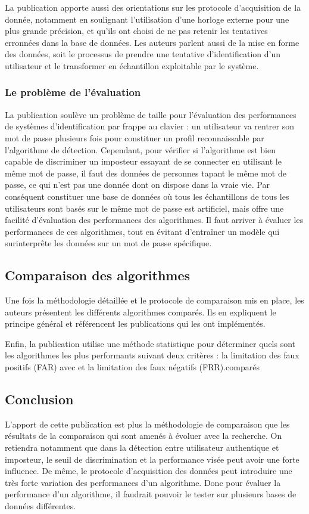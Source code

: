 La publication apporte aussi des orientations sur les protocole d'acquisition de la donnée, notamment en soulignant l'utilisation d'une horloge externe pour une plus grande précision, et qu'ils ont choisi de ne pas retenir les tentatives erronnées dans la base de données. Les auteurs parlent aussi de la mise en forme des données, soit le processus de prendre une tentative d'identification d'un utilisateur et le transformer en échantillon exploitable par le système.

\subsubsection{Le problème de l'évaluation}
La publication soulève un problème de taille pour l'évaluation des performances de systèmes d'identification par frappe au clavier : un utilisateur va rentrer son mot de passe plusieurs fois pour constituer un profil reconnaissable par l'algorithme de détection. Cependant, pour vérifier si l'algorithme est bien capable de discriminer un imposteur essayant de se connecter en utilisant le même mot de passe, il faut des données de personnes tapant le même mot de passe, ce qui n'est pas une donnée dont on dispose dans la vraie vie. Par conséquent constituer une base de données où tous les échantillons de tous les utilisateurs sont basés sur le même mot de passe est artificiel, mais offre une facilité d'évaluation des performances des algorithmes. Il faut arriver à évaluer les performances de ces algorithmes, tout en évitant d'entraîner un modèle qui surinterprête les données sur un mot de passe spécifique.

\subsection{Comparaison des algorithmes}

Une fois la méthodologie détaillée et le protocole de comparaison mis en place, les auteurs présentent les différents algorithmes comparés. Ils en expliquent le principe général et référencent les publications qui les ont implémentés.

Enfin, la publication utilise une méthode statistique pour déterminer quels sont les algorithmes les plus performants suivant deux critères : la limitation des faux positifs (FAR) avec  et la limitation des faux négatifs (FRR).comparés

\subsection{Conclusion}
L'apport de cette publication est plus la méthodologie de comparaison que les résultats de la comparaison qui sont amenés à évoluer avec la recherche. On retiendra notamment que dans la détection entre utilisateur authentique et imposteur, le seuil de discrimination et la performance visée peut avoir une
forte influence. De même, le protocole d'acquisition des données peut introduire une très forte variation des performances d'un algorithme. Donc pour évaluer la performance d'un algorithme, il faudrait pouvoir le tester sur plusieurs bases de données différentes.